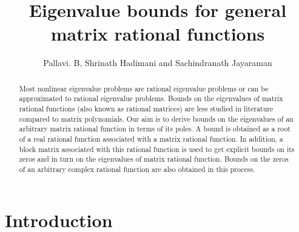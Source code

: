 \documentclass[12pt, reqno]{amsart}
\theoremstyle{definition}
\theoremstyle{remark}
\numberwithin{equation}{section}
\begin{document}
\setcounter{page}{1}

\title[Eigenvalue bounds]
{Eigenvalue bounds for general matrix rational functions}
	
\author[Pallavi, Shrinath and Sachindranath]{Pallavi. B, Shrinath Hadimani 
and Sachindranath Jayaraman}
\address{School of Mathematics\\ 
Indian Institute of Science Education and Research Thiruvananthapuram\\ 
Maruthamala P.O., Vithura, Thiruvananthapuram -- 695 551, Kerala, India.}
	
	
	
	
\begin{abstract} 
Most nonlinear eigenvalue problems are rational eigenvalue 
problems or can be approximated to rational eigenvalue problems. Bounds 
on the eigenvalues of matrix rational functions (also known as rational matrices) 
are less studied in literature compared to matrix polynomials. Our aim is to derive 
bounds on the eigenvalues of an arbitrary matrix rational function in terms of 
its poles. A bound is obtained as a root of a real rational function associated 
with a matrix rational function. In addition, a block matrix associated with this 
rational function is used to get explicit bounds on its zeros and in turn on the 
eigenvalues of matrix rational function. Bounds on the zeros of an arbitrary complex 
rational function are also obtained in this process.
\end{abstract}
	
\maketitle
	
\section{Introduction}\label{sec-1}
\end{document}

